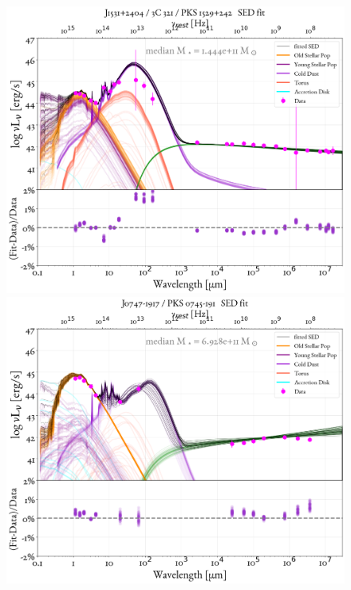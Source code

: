\begin{figure}
    \centering
    \includegraphics[width=0.85\linewidth]{figures/ResultFits/108_SEDfit_5314.png}\\
    \includegraphics[width=0.85\linewidth]{figures/ResultFits/109_SEDfit_5317.png}   
\end{figure}

